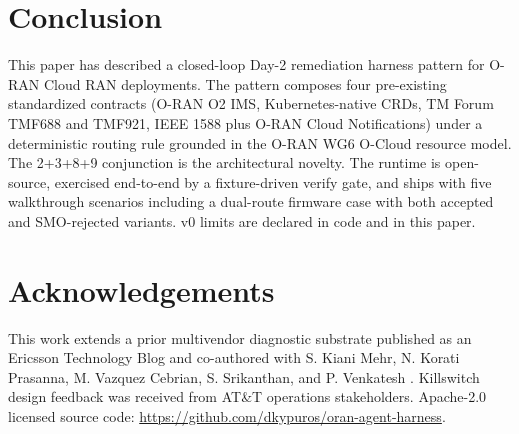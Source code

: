 \documentclass[twocolumn,10pt,a4paper]{article}
\begin{document}
\section{Conclusion}
\label{sec:conclude}

This paper has described a closed-loop Day-2 remediation harness pattern for O-RAN Cloud RAN deployments. The pattern composes four pre-existing standardized contracts (O-RAN O2 IMS, Kubernetes-native CRDs, TM Forum TMF688 and TMF921, IEEE 1588 plus O-RAN Cloud Notifications) under a deterministic routing rule grounded in the O-RAN WG6 O-Cloud resource model. The 2+3+8+9 conjunction is the architectural novelty. The runtime is open-source, exercised end-to-end by a fixture-driven verify gate, and ships with five walkthrough scenarios including a dual-route firmware case with both accepted and SMO-rejected variants. v0 limits are declared in code and in this paper.

\section*{Acknowledgements}

This work extends a prior multivendor diagnostic substrate published as an Ericsson Technology Blog and co-authored with S. Kiani Mehr, N. Korati Prasanna, M. Vazquez Cebrian, S. Srikanthan, and P. Venkatesh \cite{multivendor_blog_2026}. Killswitch design feedback was received from AT\&T operations stakeholders. Apache-2.0 licensed source code: \url{https://github.com/dkypuros/oran-agent-harness}.



\end{document}
